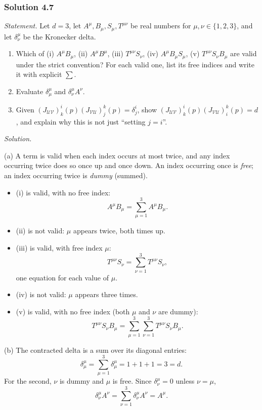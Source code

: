 \documentclass[11pt]{article}
\begin{document}
\subsubsection*{Solution 4.7}

\noindent\textit{Statement.} Let $d=3$, let $A^\mu,B_\mu,S_\mu,T^{\mu\nu}$
be real numbers for $\mu,\nu\in\{1,2,3\}$, and let $\delta^\mu_\nu$ be the
Kronecker delta.
\begin{enumerate}[label=(\alph*)]
  \item Which of (i) $A^\mu B_\mu$, (ii) $A^\mu B^\mu$, (iii)
  $T^{\mu\nu}S_\nu$, (iv) $A^\mu B_\mu S_\mu$, (v) $T^{\mu\nu}S_\nu B_\mu$
  are valid under the strict convention? For each valid one, list its free
  indices and write it with explicit $\sum$.
  \item Evaluate $\delta^\mu_\mu$ and $\delta^\mu_\nu A^\nu$.
  \item Given $(J_{\mathcal{UV}})^i_k(p)(J_{\mathcal{VU}})^k_j(p)=\delta^i_j$,
  show $(J_{\mathcal{UV}})^i_k(p)(J_{\mathcal{VU}})^k_i(p)=d$, and explain
  why this is not just ``setting $j=i$''.
\end{enumerate}

\medskip
\noindent\textit{Solution.}

(a) A term is valid when each index occurs at most twice, and any index
occurring twice does so once up and once down. An index occurring once is
\emph{free}; an index occurring twice is \emph{dummy} (summed).

\begin{itemize}
  \item (i) is valid, with no free index:
  \[
  A^\mu B_\mu=\sum_{\mu=1}^3A^\mu B_\mu.
  \]
  \item (ii) is not valid: $\mu$ appears twice, both times up.
  \item (iii) is valid, with free index $\mu$:
  \[
  T^{\mu\nu}S_\nu=\sum_{\nu=1}^3T^{\mu\nu}S_\nu,
  \]
  one equation for each value of $\mu$.
  \item (iv) is not valid: $\mu$ appears three times.
  \item (v) is valid, with no free index (both $\mu$ and $\nu$ are dummy):
  \[
  T^{\mu\nu}S_\nu B_\mu=\sum_{\mu=1}^3\sum_{\nu=1}^3T^{\mu\nu}S_\nu B_\mu.
  \]
\end{itemize}

(b) The contracted delta is a sum over its diagonal entries:
\[
\delta^\mu_\mu=\sum_{\mu=1}^3\delta^\mu_\mu=1+1+1=3=d.
\]
For the second, $\nu$ is dummy and $\mu$ is free. Since $\delta^\mu_\nu=0$
unless $\nu=\mu$,
\[
\delta^\mu_\nu A^\nu=\sum_{\nu=1}^3\delta^\mu_\nu A^\nu=A^\mu.
\]
\end{document}
